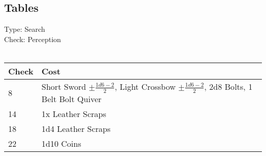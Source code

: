 \subsection{Tables}
Type: Search\\
Check: Perception\\
\\
\begin{minipage}{0.8\textwidth}
	\begin{tabular}{|l | p{11cm}|}
		\hline
		Check & Cost\\
		\hline
		8 & Short Sword $\pm \frac{1d6 - 2}{2}$, Light Crossbow $\pm \frac{1d6 - 2}{2}$, 2d8 Bolts, 1 Belt Bolt Quiver\\
		14 & 1x Leather Scraps\\
		18 & 1d4 Leather Scraps\\
		22 & 1d10 Coins\\
		\hline
	\end{tabular}
\end{minipage}
\pagebreak